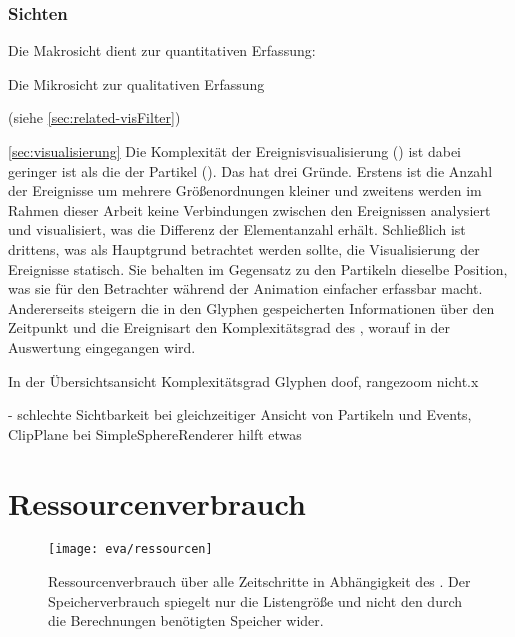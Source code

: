 \subsubsection*{Sichten}\label{sec:eva:sichten}
Die Makrosicht dient zur quantitativen Erfassung:

Die Mikrosicht zur qualitativen Erfassung 

(siehe \autoref{sec:related-visFilter})


\autoref{sec:visualisierung}
Die Komplexität der Ereignisvisualisierung () ist dabei geringer ist als die der Partikel (). Das hat drei Gründe. Erstens ist die Anzahl der Ereignisse um mehrere Größenordnungen kleiner und zweitens werden im Rahmen dieser Arbeit keine Verbindungen zwischen den Ereignissen analysiert und visualisiert, was die Differenz der Elementanzahl erhält. Schließlich ist drittens, was als Hauptgrund betrachtet werden sollte, die Visualisierung der Ereignisse statisch. Sie behalten im Gegensatz zu den Partikeln dieselbe Position, was sie für den Betrachter während der Animation einfacher erfassbar macht.
Andererseits steigern die in den Glyphen gespeicherten Informationen über den Zeitpunkt und die Ereignisart den Komplexitätsgrad des , worauf in der Auswertung eingegangen wird.

In der Übersichtsansicht Komplexitätsgrad Glyphen doof, rangezoom nicht.x


- schlechte Sichtbarkeit bei gleichzeitiger Ansicht von Partikeln und Events, ClipPlane bei SimpleSphereRenderer hilft etwas %




\section{Ressourcenverbrauch}\label{sec:eva:ressourcen}
\begin{figure}
	\texttt{[image: eva/ressourcen]}
	\caption{Ressourcenverbrauch über alle Zeitschritte in Abhängigkeit des . Der Speicherverbrauch spiegelt nur die Listengröße und nicht den durch die Berechnungen benötigten Speicher wider.}\label{fig:eva:ressourcen}
\end{figure}

